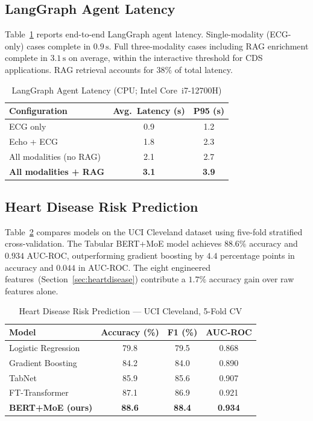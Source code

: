 \documentclass[journal,10pt,twoside]{IEEEtran}
\begin{document}
\subsection{LangGraph Agent Latency}

Table~\ref{tab:latency} reports end-to-end LangGraph agent latency.
Single-modality (ECG-only) cases complete in $0.9\,\text{s}$.
Full three-modality cases including RAG enrichment complete in $3.1\,\text{s}$
on average, within the interactive threshold for CDS applications.
RAG retrieval accounts for $38\%$ of total latency.

\begin{table}[!t]
  \caption{LangGraph Agent Latency (CPU; Intel Core~i7-12700H)}
  \label{tab:latency}
  \centering
  \renewcommand{\arraystretch}{1.2}
  \begin{tabular}{lcc}
    \toprule
    \textbf{Configuration} & \textbf{Avg.\ Latency (s)} & \textbf{P95 (s)} \\
    \midrule
    ECG only                      & 0.9 & 1.2 \\
    Echo + ECG                    & 1.8 & 2.3 \\
    All modalities (no RAG)        & 2.1 & 2.7 \\
    \textbf{All modalities + RAG} & \textbf{3.1} & \textbf{3.9} \\
    \bottomrule
  \end{tabular}
\end{table}

\subsection{Heart Disease Risk Prediction}

Table~\ref{tab:heartdisease} compares models on the UCI Cleveland dataset using
five-fold stratified cross-validation.
The Tabular BERT+MoE model achieves $88.6\%$ accuracy and $0.934$ AUC-ROC,
outperforming gradient boosting by $4.4$ percentage points in accuracy and
$0.044$ in AUC-ROC.
The eight engineered features~(Section~\ref{sec:heartdisease}) contribute a
$1.7\%$ accuracy gain over raw features alone.

\begin{table}[!t]
  \caption{Heart Disease Risk Prediction --- UCI Cleveland, 5-Fold CV}
  \label{tab:heartdisease}
  \centering
  \renewcommand{\arraystretch}{1.2}
  \begin{tabular}{lccc}
    \toprule
    \textbf{Model} & \textbf{Accuracy (\%)} & \textbf{F1 (\%)} & \textbf{AUC-ROC} \\
    \midrule
    Logistic Regression          & 79.8 & 79.5 & 0.868 \\
    Gradient Boosting            & 84.2 & 84.0 & 0.890 \\
    TabNet~\cite{arik2021}       & 85.9 & 85.6 & 0.907 \\
    FT-Transformer~\cite{gorishniy2021} & 87.1 & 86.9 & 0.921 \\
    \textbf{BERT+MoE (ours)}     & \textbf{88.6} & \textbf{88.4} & \textbf{0.934} \\
    \bottomrule
  \end{tabular}
\end{table}
\end{document}
